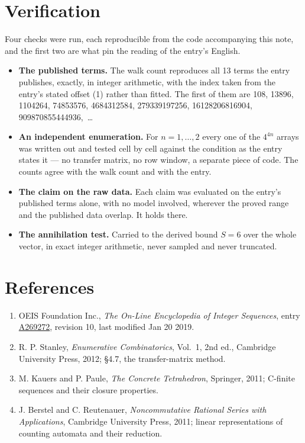 \documentclass[11pt]{article}
\theoremstyle{definition}
\begin{document}
\section{Verification}

Four checks were run, each reproducible from the code accompanying this note, and the first two are what pin the reading of the entry's English.

\begin{itemize}

\item {\bfseries The published terms.} The walk count reproduces all 13 terms the entry publishes, exactly, in integer arithmetic, with the index taken from the entry's stated offset (1) rather than fitted. The first of them are 108, 13896, 1104264, 74853576, 4684312584, 279339197256, 16128206816904, 909870855444936,~\dots

\item {\bfseries An independent enumeration.} For $n = 1,\dots,2$ every one of the $4^{4n}$ arrays was written out and tested cell by cell against the condition as the entry states it --- no transfer matrix, no row window, a separate piece of code. The counts agree with the walk count and with the entry.

\item {\bfseries The claim on the raw data.} Each claim was evaluated on the entry's published terms alone, with no model involved, wherever the proved range and the published data overlap. It holds there.

\item {\bfseries The annihilation test.} Carried to the derived bound $S = 6$ over the whole vector, in exact integer arithmetic, never sampled and never truncated.

\end{itemize}

\section{References}

\begin{enumerate}

\item OEIS Foundation Inc., \emph{The On-Line Encyclopedia of Integer Sequences}, entry \href{https://oeis.org/A269272}{A269272}, revision 10, last modified Jan 20 2019.

\item R. P. Stanley, \emph{Enumerative Combinatorics}, Vol.~1, 2nd ed., Cambridge University Press, 2012; \S4.7, the transfer-matrix method.

\item M. Kauers and P. Paule, \emph{The Concrete Tetrahedron}, Springer, 2011; C-finite sequences and their closure properties.

\item J. Berstel and C. Reutenauer, \emph{Noncommutative Rational Series with Applications}, Cambridge University Press, 2011; linear representations of counting automata and their reduction.

\end{enumerate}
\end{document}
